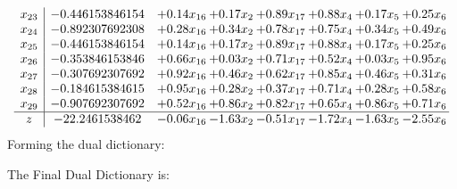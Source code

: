 \documentclass[8pt]{article}
\begin{document}
\[\begin{array}{c| c c@{\hskip 2pt} c@{\hskip 2pt} c@{\hskip 2pt} c@{\hskip 2pt} c@{\hskip 2pt} c@{\hskip 2pt} }
 x_{23}   &  -0.446153846154 & +  0.14 x_{16} & +  0.17 x_{2} & +  0.89 x_{17} & +  0.88 x_{4} & +  0.17 x_{5} & +  0.25 x_{6}\\
 x_{24}   &  -0.892307692308 & +  0.28 x_{16} & +  0.34 x_{2} & +  0.78 x_{17} & +  0.75 x_{4} & +  0.34 x_{5} & +  0.49 x_{6}\\
 x_{25}   &  -0.446153846154 & +  0.14 x_{16} & +  0.17 x_{2} & +  0.89 x_{17} & +  0.88 x_{4} & +  0.17 x_{5} & +  0.25 x_{6}\\
 x_{26}   &  -0.353846153846 & +  0.66 x_{16} & +  0.03 x_{2} & +  0.71 x_{17} & +  0.52 x_{4} & +  0.03 x_{5} & +  0.95 x_{6}\\
 x_{27}   &  -0.307692307692 & +  0.92 x_{16} & +  0.46 x_{2} & +  0.62 x_{17} & +  0.85 x_{4} & +  0.46 x_{5} & +  0.31 x_{6}\\
 x_{28}   &  -0.184615384615 & +  0.95 x_{16} & +  0.28 x_{2} & +  0.37 x_{17} & +  0.71 x_{4} & +  0.28 x_{5} & +  0.58 x_{6}\\
 x_{29}   &  -0.907692307692 & +  0.52 x_{16} & +  0.86 x_{2} & +  0.82 x_{17} & +  0.65 x_{4} & +  0.86 x_{5} & +  0.71 x_{6}\\
\hline
z    &  -22.2461538462 & -0.06 x_{16} & -1.63 x_{2} & -0.51 x_{17} & -1.72 x_{4} & -1.63 x_{5} & -2.55 x_{6}\\
\end{array}\]
Forming the dual dictionary:

The Final Dual Dictionary is: 
\end{document}
